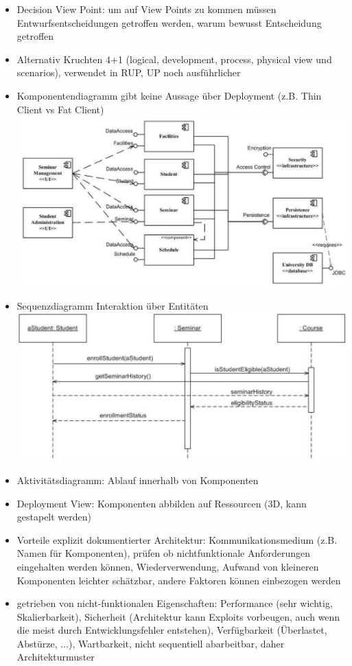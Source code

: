 \documentclass[paper=a4, fontsize=11pt]{scrartcl} %
\numberwithin{equation}{section} %
\numberwithin{figure}{section} %
\numberwithin{table}{section} %
\begin{document}
\begin{itemize}
\begin{minipage}{.5\textwidth}
  \end{minipage}
  \item Decision View Point: um auf View Points zu kommen müssen Entwurfsentscheidungen getroffen werden, warum bewusst Entscheidung getroffen
  \item Alternativ Kruchten 4+1 (logical, development, process, physical view und scenarios), verwendet in RUP, UP noch ausführlicher
  \item Komponentendiagramm gibt keine Aussage über Deployment (z.B. Thin Client vs Fat Client)\\
  \includegraphics[width=.8\textwidth]{imgs/komponenten}
  \item Sequenzdiagramm Interaktion über Entitäten\\
  \includegraphics[width=.8\textwidth]{imgs/sequenz}
  \item Aktivitätsdiagramm: Ablauf innerhalb von Komponenten
  \item Deployment View: Komponenten abbilden auf Ressourcen (3D, kann gestapelt werden)
  \item Vorteile explizit dokumentierter Architektur: Kommunikationsmedium (z.B. Namen für Komponenten), prüfen ob nichtfunktionale Anforderungen eingehalten werden können, Wiederverwendung, Aufwand von kleineren Komponenten leichter schätzbar, andere Faktoren können einbezogen werden
  \item getrieben von nicht-funktionalen Eigenschaften: Performance (sehr wichtig, Skalierbarkeit), Sicherheit (Architektur kann Exploits vorbeugen, auch wenn die meist durch Entwicklungsfehler entstehen), Verfügbarkeit (Überlastet, Abstürze, ...), Wartbarkeit, nicht sequentiell abarbeitbar, daher Architekturmuster

\end{itemize}
\end{document}
